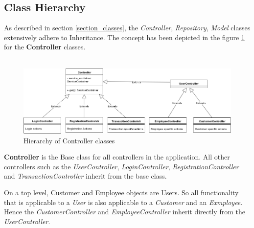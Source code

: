 \subsection{Class Hierarchy}

As described in section \ref{section_classes}, the \textit{Controller}, \textit{Repository}, \textit{Model} classes extensively adhere to Inheritance. The concept has been depicted in the figure \ref{fig:controller_hierarchy} for the \textbf{Controller} classes. \\ \\

\begin{figure}[ht]
	\centering
	\includegraphics[width=0.9\linewidth]{figures/controller_hierarchy.png}
	\caption{Hierarchy of Controller classes}
	\label{fig:controller_hierarchy}
\end{figure}

\vspace{10mm}

\textbf{Controller} is the Base class for all controllers in the application. All other controllers such as the \textit{UserController}, \textit{LoginController}, \textit{RegistrationController} and \textit{TransactionController} inherit from the base class. 

On a top level, Customer and Employee objects are Users. So all functionality that is applicable to a \textit{User} is also applicable to a \textit{Customer} and an \textit{Exmployee}. Hence the \textit{CustomerController} and \textit{EmployeeController} inherit directly from the \textit{UserController}.

\clearpage
